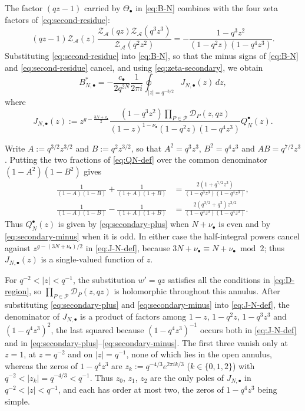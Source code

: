 \documentclass[a4paper,reqno]{amsart}
\numberwithin{equation}{section}
\theoremstyle{remark}
\theoremstyle{definition}
\newcommand{\A}{\mathcal{A}}
\begin{document}
The factor $(qz-1)$ carried by $\Theta_\bullet$ in \eqref{eq:B-N} combines
with the four zeta factors of \eqref{eq:second-residue}:
\begin{equation}\label{eq:zeta-secondary}
(qz-1)\mathcal Z_{\A}(z)
\frac{\mathcal Z_{\A}(qz)\mathcal Z_{\A}(q^3z^3)}
{\mathcal Z_{\A}(q^2z^2)}
=
-\frac{1-q^3z^2}
{(1-q^2z)(1-q^4z^3)}.
\end{equation}
Substituting \eqref{eq:second-residue} into \eqref{eq:B-N}, so that the
minus signs of \eqref{eq:B-N} and \eqref{eq:second-residue} cancel, and
using \eqref{eq:zeta-secondary}, we obtain
\begin{equation}\label{eq:B-N-explicit}
B_{N,\bullet}^{*}
=
-\frac{c_\bullet}{2q^{2N}}
\frac{1}{2\pi i}
\oint_{|z|=q^{-3/2}}
J_{N,\bullet}(z)\,dz,
\end{equation}
where
\begin{equation}\label{eq:J-N-def}
J_{N,\bullet}(z)
:=
z^{g-\frac{3N+\nu_\bullet}{2}}
\frac{(1-q^3z^2)\prod_{P\in\mathcal P}\mathcal D_P(z,qz)}
{(1-z)^{1-\nu_\bullet}(1-q^2z)(1-q^4z^3)}
Q_N^{\bullet}(z).
\end{equation}

Write $A:=q^{3/2}z^{3/2}$ and $B:=q^2z^{3/2}$, so that $A^2=q^3z^3$,
$B^2=q^4z^3$ and $AB=q^{7/2}z^3$. Putting the two fractions of
\eqref{eq:QN-def} over the common denominator $(1-A^2)(1-B^2)$ gives
\begin{align}
\frac{1}{(1-A)(1-B)}+\frac{1}{(1+A)(1+B)}
&=\frac{2(1+q^{7/2}z^3)}{(1-q^3z^3)(1-q^4z^3)},
\label{eq:secondary-plus}\\
\frac{1}{(1-A)(1-B)}-\frac{1}{(1+A)(1+B)}
&=\frac{2(q^{3/2}+q^2)z^{3/2}}{(1-q^3z^3)(1-q^4z^3)}.
\label{eq:secondary-minus}
\end{align}
Thus $Q_N^{\bullet}(z)$ is given by \eqref{eq:secondary-plus} when
$N+\nu_\bullet$ is even and by \eqref{eq:secondary-minus} when it is odd.
In either case the half-integral powers cancel against
$z^{g-(3N+\nu_\bullet)/2}$ in \eqref{eq:J-N-def}, because
$3N+\nu_\bullet\equiv N+\nu_\bullet\bmod 2$; thus $J_{N,\bullet}(z)$ is a
single-valued function of $z$.

For $q^{-2}<|z|<q^{-1}$, the substitution $w'=qz$ satisfies all the
conditions in \eqref{eq:D-region}, so
$\prod_{P\in\mathcal P}\mathcal D_P(z,qz)$ is holomorphic throughout this
annulus. After substituting \eqref{eq:secondary-plus} and
\eqref{eq:secondary-minus} into \eqref{eq:J-N-def}, the denominator of
$J_{N,\bullet}$ is a product of factors among $1-z$, $1-q^2z$, $1-q^3z^3$
and $(1-q^4z^3)^{2}$, the last squared because $(1-q^4z^3)^{-1}$ occurs both
in \eqref{eq:J-N-def} and in
\eqref{eq:secondary-plus}--\eqref{eq:secondary-minus}. The first three
vanish only at $z=1$, at $z=q^{-2}$ and on $|z|=q^{-1}$, none of which lies
in the open annulus, whereas the zeros of $1-q^4z^3$ are
$z_k:=q^{-4/3}e^{2\pi ik/3}$ ($k\in\{0,1,2\}$) with
$q^{-2}<|z_k|=q^{-4/3}<q^{-1}$. Thus $z_0$, $z_1$, $z_2$ are the only poles
of $J_{N,\bullet}$ in $q^{-2}<|z|<q^{-1}$, and each has order at most two,
the zeros of $1-q^4z^3$ being simple.
\end{document}
